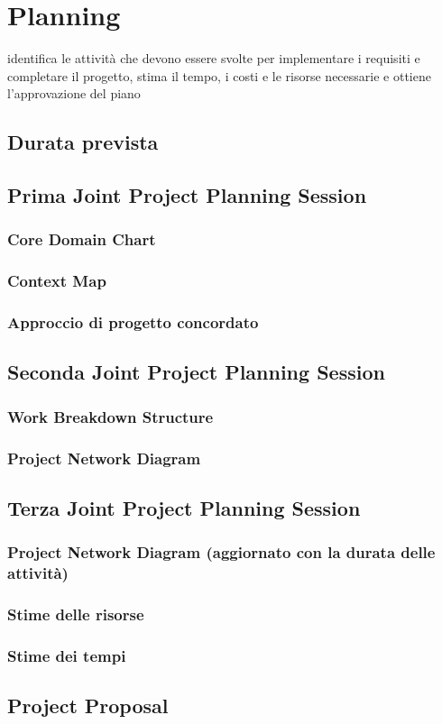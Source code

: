 \section{Planning}

identifica le attività che devono essere svolte per implementare i requisiti e completare il progetto, stima il tempo, i costi e le risorse necessarie e ottiene l'approvazione del piano
\subsection{Durata prevista}

\subsection{Prima Joint Project Planning Session}
\subsubsection{Core Domain Chart}
\subsubsection{Context Map}
\subsubsection{Approccio di progetto concordato}

\subsection{Seconda Joint Project Planning Session}
\subsubsection{Work Breakdown Structure}
\subsubsection{Project Network Diagram}

\subsection{Terza Joint Project Planning Session}
\subsubsection{Project Network Diagram (aggiornato con la durata delle attività)}
\subsubsection{Stime delle risorse}
\subsubsection{Stime dei tempi}

\subsection{Project Proposal}

